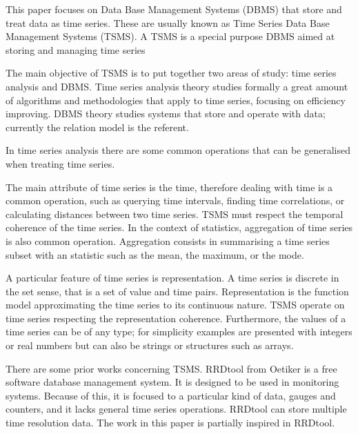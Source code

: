 
This paper focuses on Data Base Management Systems (DBMS) that store
and treat data as time series. These are usually known as Time Series
Data Base Management Systems (TSMS).  A TSMS is a special purpose DBMS
aimed at storing and managing time series

The main objective of TSMS is to put together two areas of study: time
series analysis and DBMS.  Time series analysis theory studies
formally a great amount of algorithms and methodologies that apply to
time series, focusing on efficiency improving. DBMS theory studies
systems that store and operate with data; currently the relation model
\cite{date:introduction} is the referent.


In time series analysis there are some common operations that can be
generalised when treating time series.

The main attribute of time series is the time, therefore dealing with
time is a common operation, such as querying time intervals, finding
time correlations, or calculating distances between two time
series. TSMS must respect the temporal coherence of the time series.
In the context of statistics, aggregation of time series is also
common operation. Aggregation consists in summarising a time series
subset with an statistic such as the mean, the maximum, or the mode.

A particular feature of time series is representation. A time series
is discrete in the set sense, that is a set of value and time
pairs. Representation is the function model approximating the time
series to its continuous nature. TSMS operate on time series
respecting the representation coherence. Furthermore, the values of a
time series can be of any type; for simplicity examples are presented
with integers or real numbers but can also be strings or structures
such as arrays.



There are some prior works concerning TSMS. RRDtool from Oetiker
\cite{rrdtool} is a free software database management system. It is
designed to be used in monitoring systems. Because of this, it is
focused to a particular kind of data, gauges and counters, and it
lacks general time series operations. RRDtool can store multiple time
resolution data. The work in this paper is partially inspired in
RRDtool.

